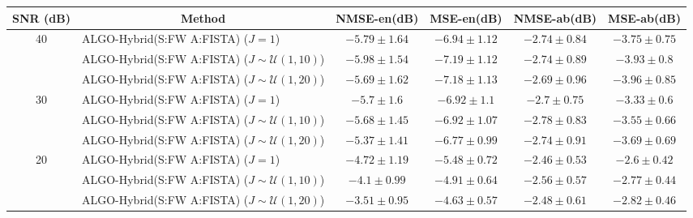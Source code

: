 \begin{table}[h]
\centering
\begin{adjustbox}{max width=\textwidth}
\begin{tabular}{|c|l|c|c|c|c|}
\hline
SNR (dB)            & \multicolumn{1}{c|}{Method}                           & NMSE-en(dB)         & MSE-en(dB)          & NMSE-ab(dB)         & MSE-ab(dB)          \tabularnewline \hline
\multirow{3}{*}{40} & ALGO-Hybrid(S:FW A:FISTA) ($J=1$)                     & $-5.79    \pm 1.64$ & $-6.94    \pm 1.12$ & $-2.74    \pm 0.84$ & $-3.75    \pm 0.75$ \tabularnewline
                    & ALGO-Hybrid(S:FW A:FISTA) ($J\sim\mathcal{U}(1,10)$)  & $-5.98    \pm 1.54$ & $-7.19    \pm 1.12$ & $-2.74    \pm 0.89$ & $-3.93    \pm 0.8$  \tabularnewline
                    & ALGO-Hybrid(S:FW A:FISTA) ($J\sim\mathcal{U}(1,20)$)  & $-5.69    \pm 1.62$ & $-7.18    \pm 1.13$ & $-2.69    \pm 0.96$ & $-3.96    \pm 0.85$ \tabularnewline \hline
\multirow{3}{*}{30} & ALGO-Hybrid(S:FW A:FISTA) ($J=1$)                     & $-5.7     \pm 1.6$  & $-6.92    \pm 1.1$  & $-2.7     \pm 0.75$ & $-3.33    \pm 0.6$  \tabularnewline
                    & ALGO-Hybrid(S:FW A:FISTA) ($J\sim\mathcal{U}(1,10)$)  & $-5.68    \pm 1.45$ & $-6.92    \pm 1.07$ & $-2.78    \pm 0.83$ & $-3.55    \pm 0.66$ \tabularnewline
                    & ALGO-Hybrid(S:FW A:FISTA) ($J\sim\mathcal{U}(1,20)$)  & $-5.37    \pm 1.41$ & $-6.77    \pm 0.99$ & $-2.74    \pm 0.91$ & $-3.69    \pm 0.69$ \tabularnewline \hline
\multirow{3}{*}{20} & ALGO-Hybrid(S:FW A:FISTA) ($J=1$)                     & $-4.72    \pm 1.19$ & $-5.48    \pm 0.72$ & $-2.46    \pm 0.53$ & $-2.6     \pm 0.42$ \tabularnewline
                    & ALGO-Hybrid(S:FW A:FISTA) ($J\sim\mathcal{U}(1,10)$)  & $-4.1     \pm 0.99$ & $-4.91    \pm 0.64$ & $-2.56    \pm 0.57$ & $-2.77    \pm 0.44$ \tabularnewline
                    & ALGO-Hybrid(S:FW A:FISTA) ($J\sim\mathcal{U}(1,20)$)  & $-3.51    \pm 0.95$ & $-4.63    \pm 0.57$ & $-2.48    \pm 0.61$ & $-2.82    \pm 0.46$ \tabularnewline \hline

\end{tabular}
\end{adjustbox}
\end{table}
